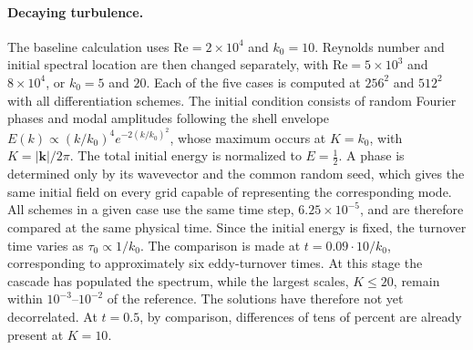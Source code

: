 \documentclass[11pt,a4paper]{article}
\newcommand{\Rey}{\mathrm{Re}}
\begin{document}
\paragraph{Decaying turbulence.}
The baseline calculation uses $\Rey=2\times10^4$ and $k_0=10$. Reynolds number and initial spectral location are then changed separately, with $\Rey=5\times10^3$ and $8\times10^4$, or $k_0=5$ and $20$. Each of the five cases is computed at $256^2$ and $512^2$ with all differentiation schemes.
The initial condition consists of random Fourier phases and modal amplitudes following the shell envelope
$E(k)\propto(k/k_0)^4e^{-2(k/k_0)^2}$, whose maximum occurs at $K=k_0$, with $K=|\mathbf k|/2\pi$. The total initial energy is normalized to $E=\tfrac12$. A phase is determined only by its wavevector and the common random seed, which gives the same initial field on every grid capable of representing the corresponding mode.
All schemes in a given case use the same time step, $6.25\times10^{-5}$, and are therefore compared at the same physical time. Since the initial energy is fixed, the turnover time varies as $\tau_0\propto1/k_0$. The comparison is made at
$t=0.09\cdot10/k_0$, corresponding to approximately six eddy-turnover times. At this stage the cascade has populated the spectrum, while the largest scales, $K\le20$, remain within $10^{-3}$--$10^{-2}$ of the reference. The solutions have therefore not yet decorrelated. At $t=0.5$, by comparison, differences of tens of percent are already present at $K=10$.
\end{document}
